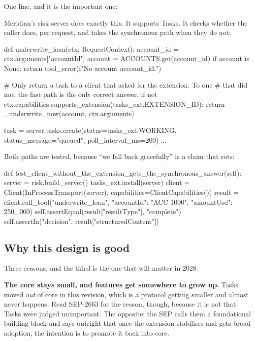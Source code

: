 One line, and it is the important one:


Meridian's risk server does exactly this. It supports Tasks. It checks whether
the caller does, per request, and takes the synchronous path when they do not:

\begin{py}
def underwrite_loan(ctx: RequestContext):
    account_id = ctx.arguments["accountId"]
    account = ACCOUNTS.get(account_id)
    if account is None:
        return tool_error(f"No account {account_id}.")

    # Only return a task to a client that asked for the extension. To one
    # that did not, the fast path is the only correct answer.
    if not ctx.capabilities.supports_extension(tasks_ext.EXTENSION_ID):
        return _underwrite_now(account, ctx.arguments)

    task = server.tasks.create(status=tasks_ext.WORKING,
                               status_message="queued", poll_interval_ms=200)
    ...
\end{py}

Both paths are tested, because ``we fall back gracefully'' is a claim that rots:

\begin{py}
def test_client_without_the_extension_gets_the_synchronous_answer(self):
    server = risk.build_server()
    tasks_ext.install(server)
    client = Client(InProcessTransport(server),
                    capabilities=ClientCapabilities())
    result = client.call_tool("underwrite_loan",
                              {"accountId": "ACC-1000", "amountUsd": 250_000})
    self.assertEqual(result["resultType"], "complete")
    self.assertIn("decision", result["structuredContent"])
\end{py}

\subsection{Why this design is good}

Three reasons, and the third is the one that will matter in 2028.

\textbf{The core stays small, and features get somewhere to grow up.} Tasks
moved \emph{out} of core in this revision, which is a protocol getting smaller
and almost never happens. Read SEP-2663 for the reason, though, because it is
not that Tasks were judged unimportant. The opposite: the SEP calls them a
foundational building block and says outright that once the extension stabilises
and gets broad adoption, the intention is to promote it back into core.

